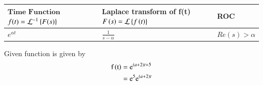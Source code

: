 \documentclass[journal,12pt,twocolumn]{IEEEtran}
\begin{document}
\begin{lemma}

\begin{center}
\begin{tabular}{ |m{3cm}|m{3.5cm}|m{1.5cm}| } 
 \hline
 $\textbf{Time Function}$ $f(t)=\mathcal{L}^{-1}\left\{F(s)\right\}$ & \textbf{Laplace transform} of f(t) $F\left(s\right)=\mathcal{L}\left\{f\left(t\right)\right\}$ & \textbf{ROC} \\ 
 \hline
 $e^{\alpha t}$ & $\frac{1}{s-\alpha}$ & $Re(s)>\alpha$\\[1ex]

 \hline
\end{tabular}
\end{center}


\end{lemma}
Given function is given by
\begin{align}
\label{eq:1}
\text{f}\left(\text{t}\right)={}& \text{e}^{\left(a+2\right)t+5}\\
\label{eq:2}
={}& \text{e}^5 \text{e}^{\left(a+2\right)t}
\end{align}
\end{document}
